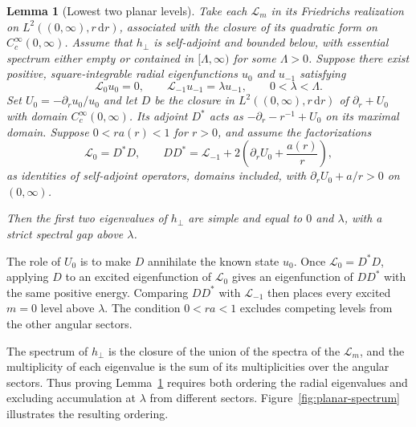 \documentclass[11pt,a4paper]{article}
\newtheorem{lemma}[theorem]{Lemma}
\theoremstyle{remark}
\theoremstyle{plain}
\begin{document}
\begin{lemma}[Lowest two planar levels]
\label{lem:ordering}
Take each $\mathcal L_m$ in its Friedrichs realization on
$L^2((0,\infty),r\,\mathrm{d}r)$, associated with the closure of its quadratic
form on $C_c^\infty(0,\infty)$. Assume that $h_\perp$ is self-adjoint
and bounded below, with essential spectrum either empty or contained in
$[\Lambda,\infty)$ for some $\Lambda>0$. 
Suppose there exist positive, square-integrable radial
eigenfunctions $u_0$ and $u_{-1}$ satisfying
\begin{equation*}
 \mathcal L_0u_0=0,\qquad \mathcal L_{-1}u_{-1}=\lambda u_{-1},\qquad
 0<\lambda<\Lambda.
\end{equation*}
Set $U_0=-\partial_ru_0/u_0$ and let $D$ be the closure in
$L^2((0,\infty),r\,\mathrm{d}r)$ of $\partial_r+U_0$ with domain
$C_c^\infty(0,\infty)$. Its adjoint $D^*$ acts as
$-\partial_r-r^{-1}+U_0$ on its maximal domain.
Suppose $0<ra(r)<1$ for $r>0$, and assume the factorizations
\begin{equation}
 \mathcal L_0=D^*D,\qquad
 DD^*=\mathcal L_{-1}+2\left(\partial_rU_0+\frac{a(r)} r\right),
 \label{eq:general-partner}
\end{equation}
as identities of self-adjoint operators, domains included, with
$\partial_rU_0+a/r>0$ on $(0,\infty)$.

Then the first two eigenvalues of $h_\perp$ are simple and equal to
$0$ and $\lambda$, with a strict spectral gap above $\lambda$.
\end{lemma}

The role of $U_0$ is to make $D$ annihilate the known state $u_0$.
Once $\mathcal L_0=D^*D$, applying $D$ to an excited eigenfunction of
$\mathcal L_0$ gives an eigenfunction of $DD^*$ with the
same positive energy. Comparing $DD^*$ with $\mathcal L_{-1}$ then
places every excited $m=0$ level above $\lambda$. The condition
$0<ra<1$ excludes competing levels from the other angular sectors.

The spectrum of $h_\perp$ is the closure of the union of the spectra
of the $\mathcal L_m$, and the multiplicity of each eigenvalue is the
sum of its multiplicities over the angular sectors. Thus proving
Lemma~\ref{lem:ordering} requires both ordering the radial
eigenvalues and excluding accumulation at $\lambda$ from different
sectors. Figure~\ref{fig:planar-spectrum} illustrates the resulting
ordering.
\end{document}
